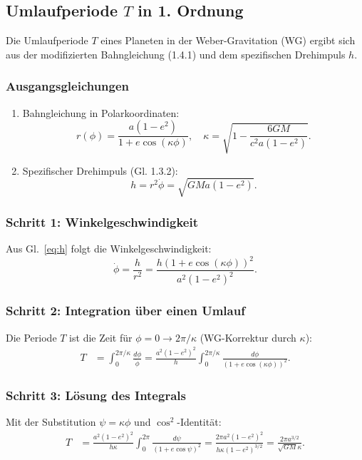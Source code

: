 \newpage
\subsection{Umlaufperiode $T$ in 1. Ordnung}
Die Umlaufperiode $T$ eines Planeten in der Weber-Gravitation (WG) ergibt sich aus der modifizierten Bahngleichung (1.4.1) und dem spezifischen Drehimpuls $h$. 

\subsubsection*{Ausgangsgleichungen}
\begin{enumerate}
    \item Bahngleichung in Polarkoordinaten:
    \begin{equation}
        r(\phi) = \frac{a(1-e^2)}{1 + e \cos(\kappa \phi)}, \quad \kappa = \sqrt{1 - \frac{6GM}{c^2 a(1-e^2)}}.
        \label{eq:bahn}
    \end{equation}
    
    \item Spezifischer Drehimpuls (Gl. 1.3.2):
    \begin{equation}
        h = r^2 \dot{\phi} = \sqrt{GMa(1-e^2)}.
        \label{eq:h}
    \end{equation}
\end{enumerate}

\subsubsection*{Schritt 1: Winkelgeschwindigkeit}
Aus Gl.~\eqref{eq:h} folgt die Winkelgeschwindigkeit:
\begin{equation}
    \dot{\phi} = \frac{h}{r^2} = \frac{h(1 + e \cos(\kappa \phi))^2}{a^2(1-e^2)^2}.
    \label{eq:dotphi}
\end{equation}

\subsubsection*{Schritt 2: Integration über einen Umlauf}
Die Periode $T$ ist die Zeit für $\phi = 0 \to 2\pi/\kappa$ (WG-Korrektur durch $\kappa$):
\begin{align}
    T &= \int_0^{2\pi/\kappa} \frac{d\phi}{\dot{\phi}} 
       = \frac{a^2(1-e^2)^2}{h} \int_0^{2\pi/\kappa} \frac{d\phi}{(1 + e \cos(\kappa \phi))^2}.
       \label{eq:T_integral}
\end{align}

\subsubsection*{Schritt 3: Lösung des Integrals}
Mit der Substitution $\psi = \kappa \phi$ und $\cos^2$-Identität:
\begin{align}
    T &= \frac{a^2(1-e^2)^2}{h \kappa} \int_0^{2\pi} \frac{d\psi}{(1 + e \cos \psi)^2} 
       = \frac{2\pi a^2(1-e^2)^2}{h \kappa (1-e^2)^{3/2}} 
       = \frac{2\pi a^{3/2}}{\sqrt{GM} \kappa}.
       \label{eq:T_solution}
\end{align}

